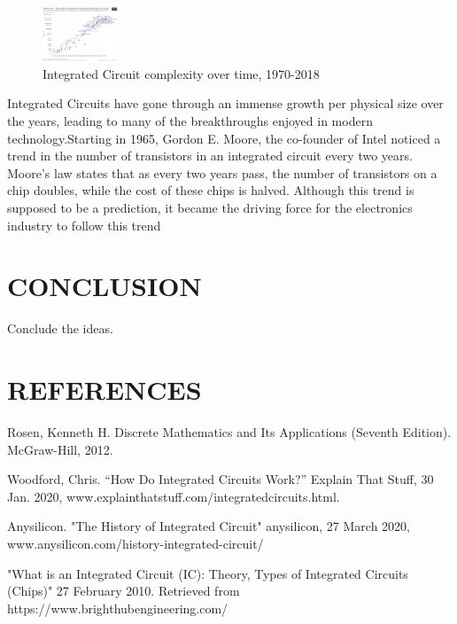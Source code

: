 \documentclass[letterpaper, 10 pt, conference]{IEEEconf}
\begin{document}
\begin{figure}[h!]
\centering
\captionsetup{justification=centering}
\includegraphics[width=0.2\textwidth]{1024px-Moore's_Law_Transistor_Count_1971-2018.png}
\caption{Integrated Circuit complexity over time, 1970-2018}
\label{fig:example}
\end{figure} 

Integrated Circuits have gone through an immense growth per physical size over the years, leading to many of the breakthroughs enjoyed in modern technology.Starting in 1965, Gordon E. Moore, the co-founder of Intel noticed a trend in the number of transistors in an integrated circuit every two years. Moore’s law states that as every two years pass, the number of transistors on a chip doubles, while the cost of these chips is halved. Although this trend is supposed to be a prediction, it became the driving force for the electronics industry to follow this trend

\section{CONCLUSION}

Conclude the ideas.

\section*{REFERENCES}


\begin{enumerate}[label={[\arabic*]}]
\item Rosen, Kenneth  H. Discrete Mathematics and Its Applications (Seventh Edition). McGraw-Hill, 2012. 
\item Woodford, Chris. “How Do Integrated Circuits Work?” Explain That Stuff, 30 Jan. 2020, www.explainthatstuff.com/integratedcircuits.html. 
\item Anysilicon. "The History of Integrated Circuit" anysilicon, 27 March 2020,
www.anysilicon.com/history-integrated-circuit/
\item "What is an Integrated Circuit (IC): Theory, Types of Integrated Circuits (Chips)" 27 February 2010. Retrieved from https://www.brighthubengineering.com/



\end{enumerate}
\end{document}
